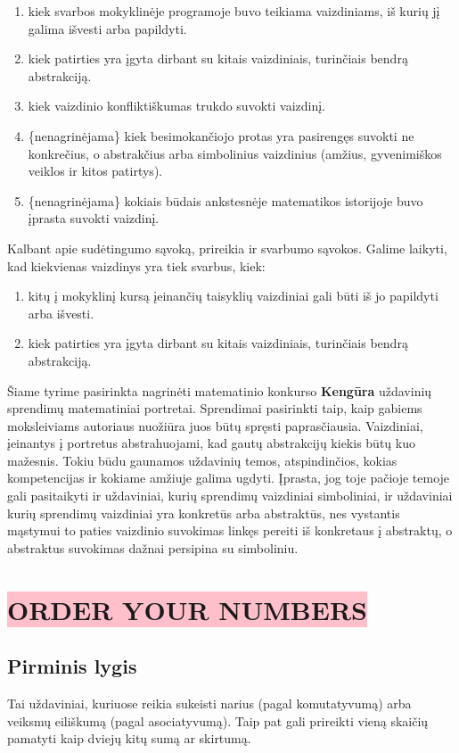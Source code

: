\documentclass[a4paper]{article}
\begin{document}
\begin{enumerate}
\item kiek svarbos mokyklinėje programoje buvo teikiama vaizdiniams, iš kurių jį galima išvesti arba papildyti.
\item kiek patirties yra įgyta dirbant su kitais vaizdiniais, turinčiais bendrą abstrakciją.
\item kiek vaizdinio konfliktiškumas trukdo suvokti vaizdinį.
\item \{nenagrinėjama\} kiek besimokančiojo protas yra pasirengęs suvokti ne konkrečius, o abstrakčius arba simbolinius vaizdinius (amžius, gyvenimiškos veiklos ir kitos patirtys).
\item \{nenagrinėjama\} kokiais būdais ankstesnėje matematikos istorijoje buvo įprasta suvokti vaizdinį.

\end{enumerate}

Kalbant apie sudėtingumo sąvoką, prireikia ir svarbumo sąvokos. Galime laikyti, kad kiekvienas vaizdinys yra tiek svarbus, kiek:

\begin{enumerate}
\item kitų į mokyklinį kursą įeinančių taisyklių vaizdiniai gali būti iš jo papildyti arba išvesti.
\item kiek patirties yra įgyta dirbant su kitais vaizdiniais, turinčiais bendrą abstrakciją.
\end{enumerate}

Šiame tyrime pasirinkta nagrinėti matematinio konkurso \textbf{Kengūra} uždavinių sprendimų matematiniai portretai. Sprendimai pasirinkti taip, kaip gabiems moksleiviams autoriaus nuožiūra juos būtų spręsti paprasčiausia. Vaizdiniai, įeinantys į portretus abstrahuojami, kad gautų abstrakcijų kiekis būtų kuo mažesnis. Tokiu būdu gaunamos uždavinių temos, atspindinčios, kokias kompetencijas ir kokiame amžiuje galima ugdyti. Įprasta, jog toje pačioje temoje gali pasitaikyti ir uždaviniai, kurių sprendimų vaizdiniai simboliniai, ir uždaviniai kurių sprendimų vaizdiniai yra konkretūs arba abstraktūs, nes vystantis mąstymui to paties vaizdinio suvokimas linkęs pereiti iš konkretaus į abstraktų, o abstraktus suvokimas dažnai persipina su simboliniu.

\section{\colorbox{pink}{ORDER YOUR NUMBERS}}
\subsection{Pirminis lygis}
Tai uždaviniai, kuriuose reikia sukeisti narius (pagal komutatyvumą) arba veiksmų eiliškumą (pagal asociatyvumą). Taip pat gali prireikti vieną skaičių pamatyti kaip dviejų kitų sumą ar skirtumą.
\end{document}
